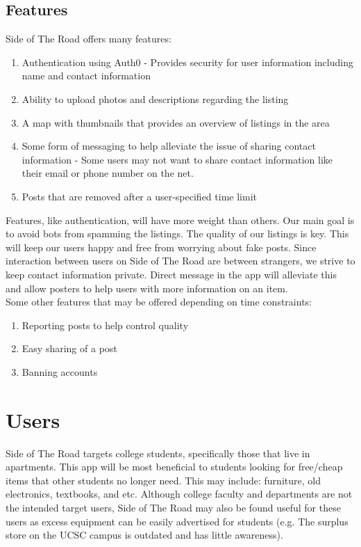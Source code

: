 \documentclass[sigconf]{acmart}
\begin{document}
\subsection{Features}
Side of The Road offers many features:
\begin{enumerate}
	\item Authentication using Auth0 - Provides security for user information including name and 
	contact information
	\item Ability to upload photos and descriptions regarding the listing
	\item A map with thumbnails that provides an overview of listings in the area
	\item Some form of messaging to help alleviate the issue of sharing contact information - Some 	users may not want to share contact information like their email or phone number on the net.
	\item Posts that are removed after a user-specified time limit
\end{enumerate}


\noindent
Features, like authentication, will have more weight than others. Our main goal is to avoid bots from spamming the listings. The quality of our listings is key. This will keep our users happy and free from worrying about fake posts. Since interaction between users on Side of The Road are between strangers, we strive to keep contact information private. Direct message in the app will alleviate this and allow posters to help users with more information on an item. \\

\noindent
Some other features that may be offered depending on time constraints:
\begin{enumerate}
	\item Reporting posts to help control quality
	\item Easy sharing of a post
	\item Banning accounts
\end{enumerate}


\section{Users}
Side of The Road targets college students, specifically those that live in apartments. This app will be most beneficial to students looking for free/cheap items that other students no longer need. This may include: furniture, old electronics, textbooks, and etc. Although college faculty and departments are not the intended target users, Side of The Road may also be found useful for these users as excess equipment can be easily advertised for students (e.g. The surplus store on the UCSC campus is outdated and has little awareness).
\end{document}
